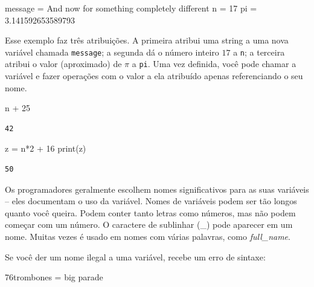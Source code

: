 \documentclass[
  brazilian,
  letterpaper,
  DIV=11,
  numbers=noendperiod]{scrreprt}
\newenvironment{Shaded}{\begin{snugshade}}{\end{snugshade}}
\newcommand{\BuiltInTok}[1]{\textcolor[rgb]{0.00,0.23,0.31}{#1}}
\newcommand{\DecValTok}[1]{\textcolor[rgb]{0.68,0.00,0.00}{#1}}
\newcommand{\ErrorTok}[1]{\textcolor[rgb]{0.68,0.00,0.00}{#1}}
\newcommand{\FloatTok}[1]{\textcolor[rgb]{0.68,0.00,0.00}{#1}}
\newcommand{\NormalTok}[1]{\textcolor[rgb]{0.00,0.23,0.31}{#1}}
\newcommand{\OperatorTok}[1]{\textcolor[rgb]{0.37,0.37,0.37}{#1}}
\newcommand{\StringTok}[1]{\textcolor[rgb]{0.13,0.47,0.30}{#1}}
\begin{document}
\begin{Shaded}
\begin{Highlighting}[]
\NormalTok{message }\OperatorTok{=} \StringTok{\textquotesingle{}And now for something completely different\textquotesingle{}}
\NormalTok{n }\OperatorTok{=} \DecValTok{17}
\NormalTok{pi }\OperatorTok{=} \FloatTok{3.141592653589793}
\end{Highlighting}
\end{Shaded}

Esse exemplo faz três atribuições. A primeira atribui uma string a uma
nova variável chamada \texttt{message}; a segunda dá o número inteiro
\(17\) a \texttt{n}; a terceira atribui o valor (aproximado) de \(\pi\)
a \texttt{pi}. Uma vez definida, você pode chamar a variável e fazer
operações com o valor a ela atribuído apenas referenciando o seu nome.

\begin{Shaded}
\begin{Highlighting}[]
\NormalTok{n }\OperatorTok{+} \DecValTok{25}
\end{Highlighting}
\end{Shaded}

\begin{verbatim}
42
\end{verbatim}

\begin{Shaded}
\begin{Highlighting}[]
\NormalTok{z }\OperatorTok{=}\NormalTok{ n}\OperatorTok{*}\DecValTok{2} \OperatorTok{+} \DecValTok{16}
\BuiltInTok{print}\NormalTok{(z)}
\end{Highlighting}
\end{Shaded}

\begin{verbatim}
50
\end{verbatim}

Os programadores geralmente escolhem nomes significativos para as suas
variáveis -- eles documentam o uso da variável. Nomes de variáveis podem
ser tão longos quanto você queira. Podem conter tanto letras como
números, mas não podem começar com um número. O caractere de sublinhar
(\_) pode aparecer em um nome. Muitas vezes é usado em nomes com várias
palavras, como \emph{full\_name}.

Se você der um nome ilegal a uma variável, recebe um erro de sintaxe:

\begin{Shaded}
\begin{Highlighting}[]
\DecValTok{76}\ErrorTok{trombones} \OperatorTok{=} \StringTok{\textquotesingle{}big parade\textquotesingle{}}
\end{Highlighting}
\end{Shaded}
\end{document}
